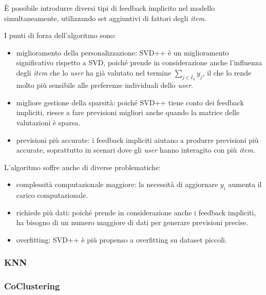 È possibile introdurre diversi tipi di feedback implicito nel modello simultaneamente, utilizzando set aggiuntivi di fattori degli \textit{item}.

I punti di forza dell'algoritmo sono:

\begin{itemize}
    \item miglioramento della personalizzazione: SVD++ è un miglioramento significativo rispetto a SVD, poiché prende in considerazione anche l'influenza degli \textit{item} che lo \textit{user} ha già valutato nel termine $\sum_{j \in I_u} y_j$, il che lo rende molto più sensibile alle preferenze individuali dello \textit{user}.
    \item migliore gestione della sparsità: poiché SVD++ tiene conto dei feedback impliciti, riesce a fare previsioni migliori anche quando la matrice delle valutazioni è sparsa.
    \item previsioni più accurate: i feedback impliciti aiutano a produrre previsioni più accurate, soprattutto in scenari dove gli \textit{user} hanno interagito con più \textit{item}.
\end{itemize}

L'algoritmo soffre anche di diverse problematiche:

\begin{itemize}
    \item complessità computazionale maggiore: la necessità di aggiornare $y_i$ aumenta il carico computazionale.
    \item richiede più dati: poiché prende in considerazione anche i feedback impliciti, ha bisogno di un numero maggiore di dati per generare previsioni precise.
    \item overfitting: SVD++ è più propenso a overfitting su dataset piccoli.
\end{itemize}


\subsubsection{KNN}\label{knn}

\subsubsection{CoClustering}\label{coclustering}

